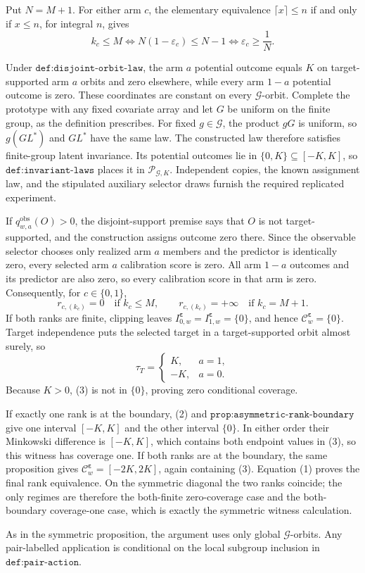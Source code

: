 Put \(N=M+1\). For either arm \(c\), the elementary equivalence \(\lceil x\rceil\le n\) if and only if \(x\le n\), for integral \(n\), gives
\[
k_c\le M\iff N(1-\varepsilon_c)\le N-1\iff\varepsilon_c\ge\frac1N.
\tag{1}
\]

Under \(\texttt{def:disjoint-orbit-law}\), the arm \(a\) potential outcome equals \(K\) on target-supported arm \(a\) orbits and zero elsewhere, while every arm \(1-a\) potential outcome is zero. These coordinates are constant on every \(\mathcal G\)-orbit. Complete the prototype with any fixed covariate array and let \(G\) be uniform on the finite group, as the definition prescribes. For fixed \(g\in\mathcal G\), the product \(gG\) is uniform, so \(g(GL^*)\) and \(GL^*\) have the same law. The constructed law therefore satisfies finite-group latent invariance. Its potential outcomes lie in \(\{0,K\}\subseteq[-K,K]\), so \(\texttt{def:invariant-laws}\) places it in \(\mathcal P_{\mathcal G,K}\). Independent copies, the known assignment law, and the stipulated auxiliary selector draws furnish the required replicated experiment.

If \(q^{\mathrm{obs}}_{w,a}(O)>0\), the disjoint-support premise says that \(O\) is not target-supported, and the construction assigns outcome zero there. Since the observable selector chooses only realized arm \(a\) members and the predictor is identically zero, every selected arm \(a\) calibration score is zero. All arm \(1-a\) outcomes and its predictor are also zero, so every calibration score in that arm is zero. Consequently, for \(c\in\{0,1\}\),
\[
r_{c,(k_c)}=0\quad\text{if }k_c\le M,\qquad r_{c,(k_c)}=+\infty\quad\text{if }k_c=M+1.
\tag{2}
\]
If both ranks are finite, clipping leaves \(I^{\boldsymbol\varepsilon}_{0,w}=I^{\boldsymbol\varepsilon}_{1,w}=\{0\}\), and hence \(\mathcal C^{\boldsymbol\varepsilon}_w=\{0\}\). Target independence puts the selected target in a target-supported orbit almost surely, so
\[
\tau_T=\begin{cases}K,&a=1,\\-K,&a=0.\end{cases}
\tag{3}
\]
Because \(K>0\), (3) is not in \(\{0\}\), proving zero conditional coverage.

If exactly one rank is at the boundary, (2) and \(\texttt{prop:asymmetric-rank-boundary}\) give one interval \([-K,K]\) and the other interval \(\{0\}\). In either order their Minkowski difference is \([-K,K]\), which contains both endpoint values in (3), so this witness has coverage one. If both ranks are at the boundary, the same proposition gives \(\mathcal C^{\boldsymbol\varepsilon}_w=[-2K,2K]\), again containing (3). Equation (1) proves the final rank equivalence. On the symmetric diagonal the two ranks coincide; the only regimes are therefore the both-finite zero-coverage case and the both-boundary coverage-one case, which is exactly the symmetric witness calculation.

As in the symmetric proposition, the argument uses only global \(\mathcal G\)-orbits. Any pair-labelled application is conditional on the local subgroup inclusion in \(\texttt{def:pair-action}\).